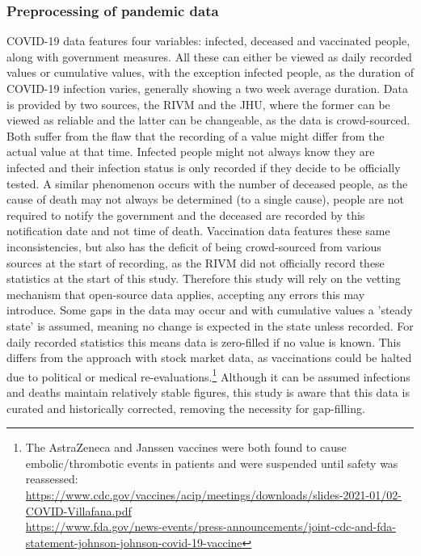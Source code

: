 \subsubsection{Preprocessing of pandemic data}
COVID-19 data features four variables: infected, deceased and vaccinated people, along with government measures. All these can either be viewed as daily recorded values or cumulative values, with the exception infected people, as the duration of COVID-19 infection varies, generally showing a two week average duration. Data is provided by two sources, the RIVM and the JHU, where the former can be viewed as reliable and the latter can be changeable, as the data is crowd-sourced. Both suffer from the flaw that the recording of a value might differ from the actual value at that time. Infected people might not always know they are infected and their infection status is only recorded if they decide to be officially tested. A similar phenomenon occurs with the number of deceased people, as the cause of death may not always be determined (to a single cause), people are not required to notify the government and the deceased are recorded by this notification date and not time of death. Vaccination data features these same inconsistencies, but also has the deficit of being crowd-sourced from various sources at the start of recording, as the RIVM did not officially record these statistics at the start of this study. Therefore this study will rely on the vetting mechanism that open-source data applies, accepting any errors this may introduce.
Some gaps in the data may occur and with cumulative values a 'steady state' is assumed, meaning no change is expected in the state unless recorded. For daily recorded statistics this means data is zero-filled if no value is known. This differs from the approach with stock market data, as vaccinations could be halted due to political or medical re-evaluations.\footnote{The AstraZeneca and Janssen vaccines were both found to cause embolic/thrombotic events in patients and were suspended until safety was reassessed: \\ \url{https://www.cdc.gov/vaccines/acip/meetings/downloads/slides-2021-01/02-COVID-Villafana.pdf}\\  \url{https://www.fda.gov/news-events/press-announcements/joint-cdc-and-fda-statement-johnson-johnson-covid-19-vaccine}}
Although it can be assumed infections and deaths maintain relatively stable figures, this study is aware that this data is curated and historically corrected, removing the necessity for gap-filling.
